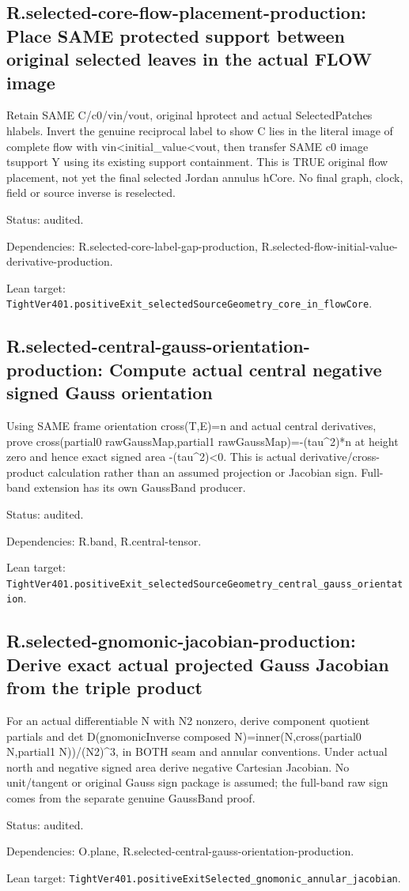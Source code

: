 \documentclass{article}
\begin{document}
\subsection*{R.selected-core-flow-placement-production: Place SAME protected support between original selected leaves in the actual FLOW image}
Retain SAME C/c0/vin/vout, original hprotect and actual SelectedPatches hlabels. Invert the genuine reciprocal label to show C lies in the literal image of complete flow with vin<initial\_value<vout, then transfer SAME c0 image tsupport Y using its existing support containment. This is TRUE original flow placement, not yet the final selected Jordan annulus hCore. No final graph, clock, field or source inverse is reselected.
\par Status: audited.
\par Dependencies: R.selected-core-label-gap-production, R.selected-flow-initial-value-derivative-production.
\par Lean target: \texttt{TightVer401.positiveExit\_selectedSourceGeometry\_core\_in\_flowCore}.
\subsection*{R.selected-central-gauss-orientation-production: Compute actual central negative signed Gauss orientation}
Using SAME frame orientation cross(T,E)=n and actual central derivatives, prove cross(partial0 rawGaussMap,partial1 rawGaussMap)=-(tau^2)*n at height zero and hence exact signed area -(tau^2)<0. This is actual derivative/cross-product calculation rather than an assumed projection or Jacobian sign. Full-band extension has its own GaussBand producer.
\par Status: audited.
\par Dependencies: R.band, R.central-tensor.
\par Lean target: \texttt{TightVer401.positiveExit\_selectedSourceGeometry\_central\_gauss\_orientation}.
\subsection*{R.selected-gnomonic-jacobian-production: Derive exact actual projected Gauss Jacobian from the triple product}
For an actual differentiable N with N2 nonzero, derive component quotient partials and det D(gnomonicInverse composed N)=inner(N,cross(partial0 N,partial1 N))/(N2)^3, in BOTH seam and annular conventions. Under actual north and negative signed area derive negative Cartesian Jacobian. No unit/tangent or original Gauss sign package is assumed; the full-band raw sign comes from the separate genuine GaussBand proof.
\par Status: audited.
\par Dependencies: O.plane, R.selected-central-gauss-orientation-production.
\par Lean target: \texttt{TightVer401.positiveExitSelected\_gnomonic\_annular\_jacobian}.
\end{document}
